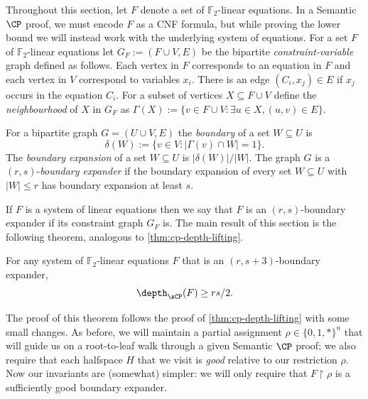 \documentclass{toc}
\begin{document}
Throughout this section, let $F$ denote a set of $\mathbb{F}_2$-linear equations.
In a Semantic $\CP$ proof, we must encode $F$ as a CNF formula, but while proving the lower bound we will instead work with the underlying system of equations.
For a set $F$ of $\mathbb{F}_2$-linear equations let $G_F := (F \cup V, E)$ be the bipartite \emph{constraint-variable} graph defined as follows. 
Each vertex in $F$ corresponds to an equation in $F$ and each vertex in $V$ correspond to variables $x_i$. 
There is an edge $(C_i,x_j) \in E$ if $x_j$ occurs in the equation $C_i$.
For a subset of vertices $X \subseteq F \cup V$ define the \emph{neighbourhood} of $X$ in $G_F$ as $\Gamma(X):= \{v \in F \cup V : \exists u \in X, (u,v) \in E\}$.

\begin{definition}\label{def:expansion}
	For a bipartite graph $G=(U \cup V, E)$ the \emph{boundary} of a set $W \subseteq U$ is \[\delta(W):= \{v \in V : |\Gamma(v) \cap W| = 1\}.\]
	The \emph{boundary expansion} of a set $W \subseteq U$ is $|\delta(W)|/|W|$. 
	The graph $G$ is a $(r, s)$-\emph{boundary expander} if the boundary expansion of every set $W \subseteq U$ with $|W| \leq r$ has boundary expansion at least $s$.
\end{definition}

If $F$ is a system of linear equations then we say that $F$ is an $(r,s)$-boundary expander if its constraint graph $G_{F}$ is.
The main result of this section is the following theorem, analogous to \autoref{thm:cp-depth-lifting}.

\begin{theorem}\label{thm:expander-lb}
	For any system of $\mathbb{F}_2$-linear equations $F$ that is an $(r, s+3)$-boundary expander, \[\depth_{\sCP}(F) \geq rs/2.\]
\end{theorem}

The proof of this theorem follows the proof of \autoref{thm:cp-depth-lifting} with some small changes.
As before, we will maintain a partial assignment $\rho \in \{0,1,*\}^n$ that will guide us on a root-to-leaf walk through a given Semantic $\CP$ proof; we also require that each halfspace $H$ that we visit is \emph{good} relative to our restriction $\rho$.
Now our invariants are (somewhat) simpler: we will only require that $F \restriction \rho$ is a sufficiently good boundary expander.
\end{document}

